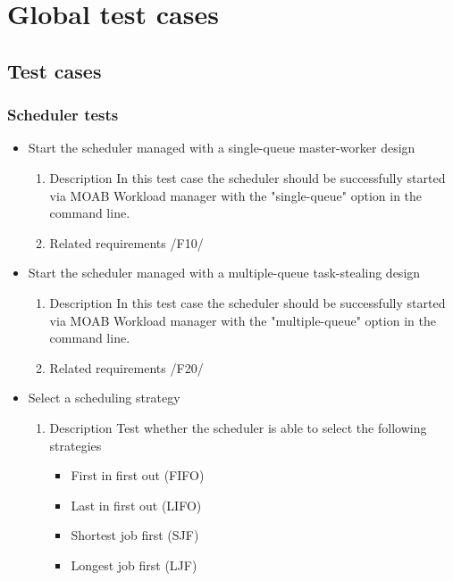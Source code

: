 {
\setcounter{test}{10}
\renewcommand{\labelitemi}{
	\ifnum \value{test}<10$/T 0\arabic{test} /$\addtocounter{test}{10}
	\else $/T \arabic{test} /$\addtocounter{test}{10}\fi
}

\section{Global test cases}
	\subsection{Test cases}
		\subsubsection{Scheduler tests}
			\begin{itemize}
				
				\item Start the scheduler managed with a single-queue master-worker design 				
				
					\begin{enumerate}
						\item Description\newline
In this test case the scheduler should be successfully started via MOAB Workload manager with the "single-queue" option in the command line.
						\item Related requirements\newline
 							  /F10/		
					\end{enumerate}					  
											
				
				
				\item Start the scheduler managed with a multiple-queue task-stealing design
				\begin{enumerate}
						\item Description\newline
In this test case the scheduler should be successfully started via MOAB Workload manager with the "multiple-queue" option in the command line.
						\item Related requirements\newline
 							  /F20/		
				\end{enumerate}	
				
				
				\item Select a scheduling strategy 
			    \begin{enumerate}
						\item Description\newline
							Test whether the scheduler is able to select the following strategies
							\begin{itemize}
							 	\item First in first out (FIFO)
							 	\item Last in first out (LIFO)
							 	\item Shortest job first (SJF)
							 	\item Longest job first
(LJF)
								

\end{itemize}
\end{enumerate}
\end{itemize}}
